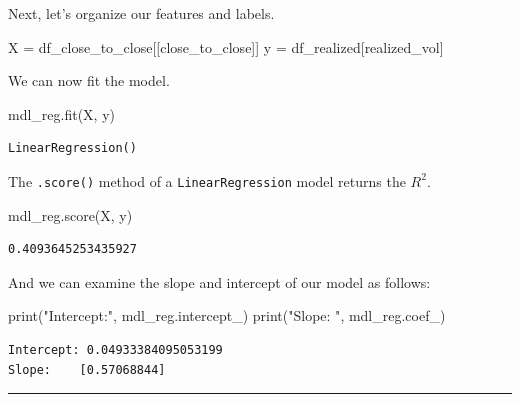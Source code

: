 \documentclass[
  letterpaper,
  DIV=11,
  numbers=noendperiod]{scrreprt}
\newenvironment{Shaded}{\begin{snugshade}}{\end{snugshade}}
\newcommand{\BuiltInTok}[1]{\textcolor[rgb]{0.00,0.23,0.31}{#1}}
\newcommand{\NormalTok}[1]{\textcolor[rgb]{0.00,0.23,0.31}{#1}}
\newcommand{\OperatorTok}[1]{\textcolor[rgb]{0.37,0.37,0.37}{#1}}
\newcommand{\StringTok}[1]{\textcolor[rgb]{0.13,0.47,0.30}{#1}}
\begin{document}
Next, let's organize our features and labels.

\begin{Shaded}
\begin{Highlighting}[]
\NormalTok{X }\OperatorTok{=}\NormalTok{ df\_close\_to\_close[[}\StringTok{\textquotesingle{}close\_to\_close\textquotesingle{}}\NormalTok{]]}
\NormalTok{y }\OperatorTok{=}\NormalTok{ df\_realized[}\StringTok{\textquotesingle{}realized\_vol\textquotesingle{}}\NormalTok{]}
\end{Highlighting}
\end{Shaded}

We can now fit the model.

\begin{Shaded}
\begin{Highlighting}[]
\NormalTok{mdl\_reg.fit(X, y)}
\end{Highlighting}
\end{Shaded}

\begin{verbatim}
LinearRegression()
\end{verbatim}

The \texttt{.score()} method of a \texttt{LinearRegression} model
returns the \(R^2\).

\begin{Shaded}
\begin{Highlighting}[]
\NormalTok{mdl\_reg.score(X, y)}
\end{Highlighting}
\end{Shaded}

\begin{verbatim}
0.4093645253435927
\end{verbatim}

And we can examine the slope and intercept of our model as follows:

\begin{Shaded}
\begin{Highlighting}[]
\BuiltInTok{print}\NormalTok{(}\StringTok{"Intercept:"}\NormalTok{, mdl\_reg.intercept\_)}
\BuiltInTok{print}\NormalTok{(}\StringTok{"Slope:   "}\NormalTok{, mdl\_reg.coef\_)}
\end{Highlighting}
\end{Shaded}

\begin{verbatim}
Intercept: 0.04933384095053199
Slope:    [0.57068844]
\end{verbatim}

\begin{center}\rule{0.5\linewidth}{0.5pt}\end{center}
\end{document}
